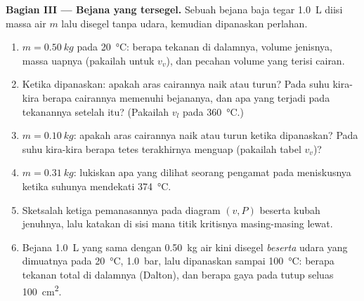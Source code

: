 \begin{problem}
\medskip
\noindent\textbf{Bagian III --- Bejana yang tersegel.}
Sebuah bejana baja tegar \qty{1.0}{L} diisi massa air $m$
lalu disegel tanpa udara, kemudian dipanaskan perlahan.
\begin{enumerate}[resume]
  \item $m = \qty{0.50}{kg}$ pada \qty{20}{\degreeCelsius}: berapa tekanan di dalamnya,
        volume jenisnya, massa uapnya (pakailah  untuk $v_v$),
        dan pecahan volume yang terisi cairan.
  \item Ketika dipanaskan: apakah aras cairannya naik atau turun? Pada suhu kira-kira
        berapa cairannya memenuhi bejananya, dan apa yang terjadi pada
        tekanannya setelah itu? (Pakailah $v_l$ pada \qty{360}{\degreeCelsius}.)
  \item $m = \qty{0.10}{kg}$: apakah aras cairannya naik atau turun ketika
        dipanaskan? Pada suhu kira-kira berapa tetes terakhirnya
        menguap (pakailah tabel $v_v$)?
  \item $m = \qty{0.31}{kg}$: lukiskan apa yang dilihat seorang pengamat pada
        meniskusnya ketika suhunya mendekati \qty{374}{\degreeCelsius}.
  \item Sketsalah ketiga  pemanasannya pada diagram $(v, P)$ beserta
        kubah jenuhnya, lalu katakan di sisi mana titik kritisnya masing-masing
        lewat.
  \item Bejana \qty{1.0}{L} yang sama dengan \qty{0.50}{kg} air kini
        disegel \emph{beserta} udara yang dimuatnya pada \qty{20}{\degreeCelsius},
        \qty{1.0}{bar}, lalu dipanaskan sampai \qty{100}{\degreeCelsius}: berapa tekanan
        total di dalamnya (Dalton), dan berapa gaya pada tutup seluas \qty{100}{cm^2}.
\end{enumerate}


\end{problem}
